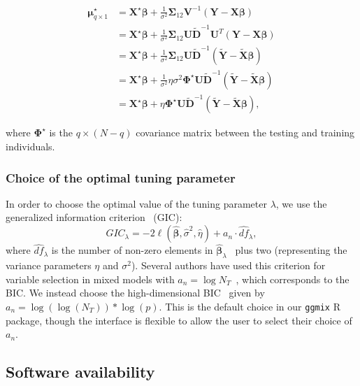 \documentclass[10pt,letterpaper]{article}
\newcommand{\bX}{\textbf{X}}
\newcommand{\bY}{\textbf{Y}}
\newcommand{\bD}{\textbf{D}}
\newcommand{\bXtilde}{\widetilde{\bX}}
\newcommand{\bYtilde}{\widetilde{\bY}}
\newcommand{\bDtilde}{\widetilde{\bD}}
\newcommand{\bU}{\textbf{U}}
\newcommand{\bV}{\textbf{V}}
\newcommand{\bSigma}{\boldsymbol{\Sigma}}
\newcommand{\bmu}{\boldsymbol{\mu}}
\newcommand{\bbeta}{\boldsymbol{\beta}}
\newcommand{\bPhi}{\boldsymbol{\Phi}}
\begin{document}
\begin{align*}
\bmu^\star_{q \times 1} & = \bX^\star \bbeta + \frac{1}{\sigma^2} \bSigma_{12} \bV^{-1} (\bY - \bX \bbeta)\\
& = \bX^\star \bbeta + \frac{1}{\sigma^2} \bSigma_{12} \bU \bDtilde^{-1} \bU^T (\bY - \bX \bbeta)\\
& = \bX^\star \bbeta + \frac{1}{\sigma^2} \bSigma_{12} \bU \bDtilde^{-1} (\bYtilde - \bXtilde \bbeta ) \\
& = \bX^\star \bbeta + \frac{1}{\sigma^2} \eta \sigma^2 \bPhi^\star \bU \bDtilde^{-1} (\bYtilde - \bXtilde \bbeta ) \\
& = \bX^\star \bbeta +  \eta  \bPhi^\star \bU \bDtilde^{-1} (\bYtilde - \bXtilde \bbeta ),
\end{align*}

where $\bPhi^\star$ is the $q \times (N-q)$ covariance matrix between the testing and training individuals.



\subsubsection*{Choice of the optimal tuning parameter} \label{subsubsec:gic}

In order to choose the optimal value of the tuning parameter $\lambda$, we use the generalized information criterion~\cite{nishii1984asymptotic} (GIC):
\begin{equation*}
GIC_{\lambda} = -2 \ell(\widehat{\bbeta}, \widehat{\sigma}^2, \widehat{\eta}) + a_n \cdot \widehat{df}_{\lambda},
\end{equation*}
where $\widehat{df}_{\lambda}$ is the number of non-zero elements in $\widehat{\bbeta}_{\lambda}$~\cite{zou2007degrees} plus two (representing the variance parameters $\eta$ and $\sigma^2$). Several authors have used this criterion for variable selection in mixed models with $a_n = \log N_T$~\cite{bondell2010joint,schelldorfer2011estimation}, which corresponds to the BIC. We instead choose the high-dimensional BIC~\cite{fan2013tuning} given by $a_n = \log(\log(N_T)) * \log(p)$. This is the default choice in our \texttt{ggmix} R package, though the interface is flexible to allow the user to select their choice of $a_n$.




\subsection*{Software availability}
\end{document}
